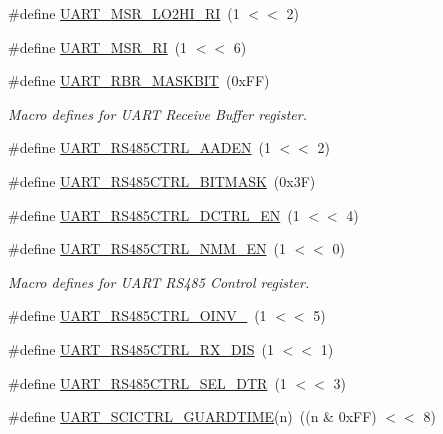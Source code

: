 \begin{DoxyCompactItemize}
\#define \hyperlink{group__UART__17XX__40XX_ga5b2defd6ffec805753fbf799838984ed}{U\+A\+R\+T\+\_\+\+M\+S\+R\+\_\+\+L\+O2\+H\+I\+\_\+\+RI}~(1 $<$$<$ 2)
\item 
\#define \hyperlink{group__UART__17XX__40XX_ga1f4efd8727007b41de36b8b6ab9d4f6b}{U\+A\+R\+T\+\_\+\+M\+S\+R\+\_\+\+RI}~(1 $<$$<$ 6)
\item 
\#define \hyperlink{group__UART__17XX__40XX_ga06774e65c2ca095c4373122ed9a390b8}{U\+A\+R\+T\+\_\+\+R\+B\+R\+\_\+\+M\+A\+S\+K\+B\+IT}~(0x\+F\+F)
\begin{DoxyCompactList}\small\item\em Macro defines for U\+A\+RT Receive Buffer register. \end{DoxyCompactList}\item 
\#define \hyperlink{group__UART__17XX__40XX_ga1e4adf900200efcdfaab657b180b30d1}{U\+A\+R\+T\+\_\+\+R\+S485\+C\+T\+R\+L\+\_\+\+A\+A\+D\+EN}~(1 $<$$<$ 2)
\item 
\#define \hyperlink{group__UART__17XX__40XX_ga4ab3c90d083989134e4881e0b82e7364}{U\+A\+R\+T\+\_\+\+R\+S485\+C\+T\+R\+L\+\_\+\+B\+I\+T\+M\+A\+SK}~(0x3\+F)
\item 
\#define \hyperlink{group__UART__17XX__40XX_gaa00bb66207fce982ed0dbd6325d8fb66}{U\+A\+R\+T\+\_\+\+R\+S485\+C\+T\+R\+L\+\_\+\+D\+C\+T\+R\+L\+\_\+\+EN}~(1 $<$$<$ 4)
\item 
\#define \hyperlink{group__UART__17XX__40XX_ga0b5e5ccc3ad07acad2bfa3f0846cbfd0}{U\+A\+R\+T\+\_\+\+R\+S485\+C\+T\+R\+L\+\_\+\+N\+M\+M\+\_\+\+EN}~(1 $<$$<$ 0)
\begin{DoxyCompactList}\small\item\em Macro defines for U\+A\+RT R\+S485 Control register. \end{DoxyCompactList}\item 
\#define \hyperlink{group__UART__17XX__40XX_gaadf3ec8419a76ba6c3ccd2a4eb9b233b}{U\+A\+R\+T\+\_\+\+R\+S485\+C\+T\+R\+L\+\_\+\+O\+I\+N\+V\+\_}~(1 $<$$<$ 5)
\item 
\#define \hyperlink{group__UART__17XX__40XX_gacdaee14296a914ca14d877069414f88f}{U\+A\+R\+T\+\_\+\+R\+S485\+C\+T\+R\+L\+\_\+\+R\+X\+\_\+\+D\+IS}~(1 $<$$<$ 1)
\item 
\#define \hyperlink{group__UART__17XX__40XX_ga0632053088b7e65c6000274a90a76091}{U\+A\+R\+T\+\_\+\+R\+S485\+C\+T\+R\+L\+\_\+\+S\+E\+L\+\_\+\+D\+TR}~(1 $<$$<$ 3)
\item 
\#define \hyperlink{group__UART__17XX__40XX_gac74665d22f8c0c1b18f46a65bbe5031a}{U\+A\+R\+T\+\_\+\+S\+C\+I\+C\+T\+R\+L\+\_\+\+G\+U\+A\+R\+D\+T\+I\+ME}(n)~((n \& 0x\+F\+F) $<$$<$ 8)
$$
\end{DoxyCompactItemize}
